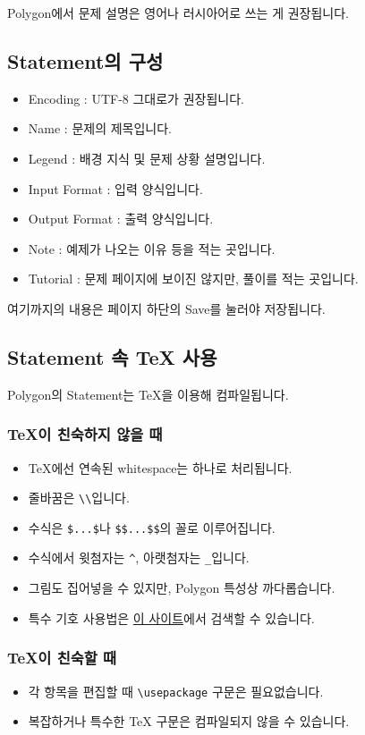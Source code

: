 \documentclass{article}
\begin{document}
    Polygon에서 문제 설명은 영어나 러시아어로 쓰는 게 권장됩니다.
    \subsection{Statement의 구성}
    \begin{itemize}
        \item Encoding : UTF-8 그대로가 권장됩니다.
        \item Name : 문제의 제목입니다.
        \item Legend : 배경 지식 및 문제 상황 설명입니다.
        \item Input Format : 입력 양식입니다.
        \item Output Format : 출력 양식입니다.
        \item Note : 예제가 나오는 이유 등을 적는 곳입니다.
        \item Tutorial : 문제 페이지에 보이진 않지만, 풀이를 적는 곳입니다.
    \end{itemize}
    여기까지의 내용은 페이지 하단의 Save를 눌러야 저장됩니다.
    \subsection{Statement 속 TeX 사용}
    Polygon의 Statement는 TeX을 이용해 컴파일됩니다.
    \subsubsection{TeX이 친숙하지 않을 때}
    \begin{itemize}
        \item TeX에선 연속된 whitespace는 하나로 처리됩니다.
        \item 줄바꿈은 \verb|\\|입니다.
        \item 수식은 \verb|$...$|나 \verb|$$...$$|의 꼴로 이루어집니다.
        \item 수식에서 윗첨자는 \verb|^|, 아랫첨자는 \verb|_|입니다.
        \item 그림도 집어넣을 수 있지만, Polygon 특성상 까다롭습니다.
        \item 특수 기호 사용법은 {\color{blue}\href{http://detexify.kirelabs.org/classify.html}{이 사이트}}에서 검색할 수 있습니다.
    \end{itemize}
    \subsubsection{TeX이 친숙할 때}
    \begin{itemize}
        \item 각 항목을 편집할 때 \verb|\usepackage| 구문은 필요없습니다.
        \item 복잡하거나 특수한 TeX 구문은 컴파일되지 않을 수 있습니다.
    \end{itemize}
\end{document}

